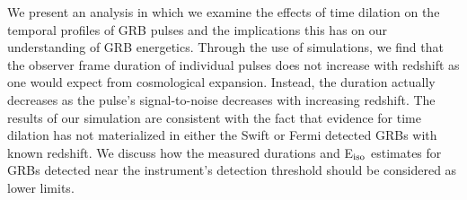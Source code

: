 


\bigskip



\bigskip

\noindent We present an analysis in which we examine the effects of time dilation on the temporal profiles of GRB pulses and the implications this has on our understanding of GRB energetics.  Through the use of simulations, we find that the observer frame duration of individual pulses does not increase with redshift as one would expect from cosmological expansion. Instead, the duration actually decreases as the pulse's signal-to-noise decreases with increasing redshift.  The results of our simulation are consistent with the fact that evidence for time dilation has not materialized in either the Swift or Fermi detected GRBs with known redshift.  We discuss how the measured durations and E$_{\rm iso}$ estimates for GRBs detected near the instrument's detection threshold should be considered as lower limits.

